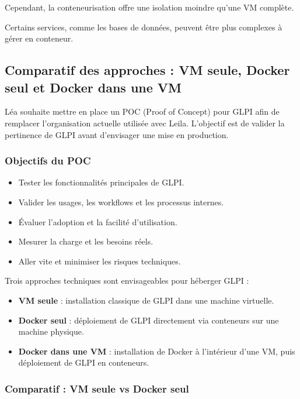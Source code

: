 \noindent Cependant, la conteneurisation offre une isolation moindre qu’une VM complète.

\noindent Certains services, comme les bases de données, peuvent être plus complexes à gérer en conteneur.

\subsection*{Comparatif des approches : VM seule, Docker seul et Docker dans une VM}
{}

\noindent Léa souhaite mettre en place un POC (Proof of Concept) pour GLPI afin de remplacer l'organisation actuelle utilisée avec Leila. L’objectif est de valider la pertinence de GLPI avant d'envisager une mise en production.

\subsubsection*{Objectifs du POC}
\begin{itemize}
  \item Tester les fonctionnalités principales de GLPI.
  \item Valider les usages, les workflows et les processus internes.
  \item Évaluer l’adoption et la facilité d'utilisation.
  \item Mesurer la charge et les besoins réels.
  \item Aller vite et minimiser les risques techniques.
\end{itemize}

\noindent Trois approches techniques sont envisageables pour héberger GLPI :
\begin{itemize}
  \item \textbf{VM seule} : installation classique de GLPI dans une machine virtuelle.
  \item \textbf{Docker seul} : déploiement de GLPI directement via conteneurs sur une machine physique.
  \item \textbf{Docker dans une VM} : installation de Docker à l’intérieur d’une VM, puis déploiement de GLPI en conteneurs.
\end{itemize}

\subsubsection*{Comparatif : VM seule vs Docker seul}
{}

